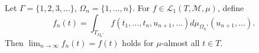 Let $\Gamma = \{1,2,3,\ldots\}$, $\Omega_n = \{1,\ldots,n\}$. For $f \in \mathcal{L}_1(T,\mathcal{M},\mu)$, define
$$f_n(t) = \int_{T_{\Omega_n'}} f(t_1,\ldots,t_n, u_{n+1},\ldots) d\mu_{\Omega_n'}(u_{n+1},\ldots).$$
Then $\lim_{n\to\infty} f_n(t) = f(t)$ holds for $\mu$-almost all $t \in T$.
